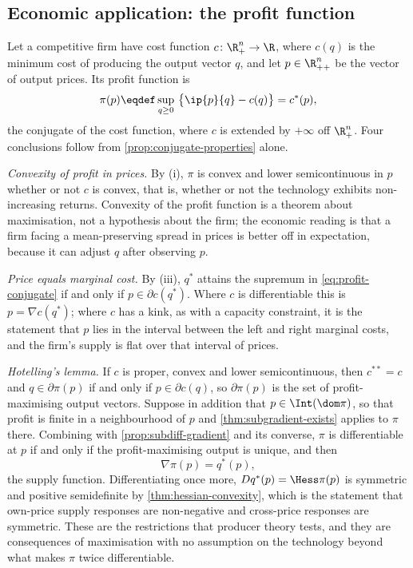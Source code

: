 \subsection{Economic application: the profit function}\label{subsec:cvx-profit}

Let a competitive firm have cost function $c\colon\R^n_+\to\R$, where $c(q)$ is
the minimum cost of producing the output vector $q$, and let $p\in\R^n_{++}$ be
the vector of output prices. Its profit function is
\begin{equation}\label{eq:profit-conjugate}
	\pi(p)\eqdef\sup_{q\geq0}\ \bigl\{\ip{p}{q}-c(q)\bigr\}=c^{\ast}(p),
\end{equation}
the conjugate of the cost function, where $c$ is extended by $+\infty$ off
$\R^n_+$. Four conclusions follow from \autoref{prop:conjugate-properties} alone.

\emph{Convexity of profit in prices.} By (i), $\pi$ is convex and lower
semicontinuous in $p$ whether or not $c$ is convex, that is, whether or not the
technology exhibits non-increasing returns. Convexity of the profit function is a
theorem about maximisation, not a hypothesis about the firm; the economic reading
is that a firm facing a mean-preserving spread in prices is better off in
expectation, because it can adjust $q$ after observing $p$.

\emph{Price equals marginal cost.} By (iii), $q^\ast$ attains the supremum in
\eqref{eq:profit-conjugate} if and only if $p\in\partial c(q^\ast)$. Where $c$ is
differentiable this is $p=\nabla c(q^\ast)$; where $c$ has a kink, as with a
capacity constraint, it is the statement that $p$ lies in the interval between
the left and right marginal costs, and the firm's supply is flat over that
interval of prices.

\emph{Hotelling's lemma.} If $c$ is proper, convex and lower semicontinuous,
then $c^{\ast\ast}=c$ and $q\in\partial\pi(p)$ if and only if
$p\in\partial c(q)$, so $\partial\pi(p)$ is the set of profit-maximising output
vectors. Suppose in addition that $p\in\Int(\dom\pi)$, so that profit is finite
in a neighbourhood of $p$ and \autoref{thm:subgradient-exists} applies to $\pi$
there. Combining with \autoref{prop:subdiff-gradient} and its converse, $\pi$ is
differentiable at $p$ if and only if the profit-maximising output is unique, and
then
\begin{equation}\label{eq:hotelling}
	\nabla\pi(p)=q^\ast(p),
\end{equation}
the supply function. Differentiating once more, $Dq^\ast(p)=\Hess\pi(p)$ is
symmetric and positive semidefinite by \autoref{thm:hessian-convexity}, which is
the statement that own-price supply responses are non-negative and cross-price
responses are symmetric. These are the restrictions that producer theory tests,
and they are consequences of maximisation with no assumption on the technology
beyond what makes $\pi$ twice differentiable.

